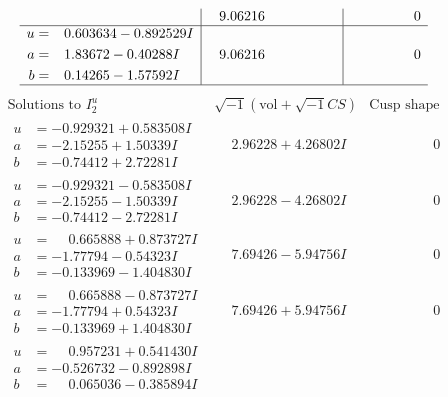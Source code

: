 \documentclass[1p]{elsarticle_modified}
\theoremstyle{definition}
\newcommand{\I}{\sqrt{-1}}
\begin{document}
$$\begin{array}{c|c|c}
 & \phantom{-}9.06216\phantom{ +0.000000I} & \phantom{-0.000000 } 0 \\ \hline\begin{aligned}
u &= \phantom{-}0.603634 - 0.892529 I \\
a &= \phantom{-}1.83672 - 0.40288 I \\
b &= \phantom{-}0.14265 - 1.57592 I\end{aligned}
 & \phantom{-}9.06216\phantom{ +0.000000I} & \phantom{-0.000000 } 0\\
 \hline 
 \end{array}$$\newpage$$\begin{array}{c|c|c}  
\text{Solutions to }I^u_{2}& \I (\text{vol} + \sqrt{-1}CS) & \text{Cusp shape}\\
 \hline 
\begin{aligned}
u &= -0.929321 + 0.583508 I \\
a &= -2.15255 + 1.50339 I \\
b &= -0.74412 + 2.72281 I\end{aligned}
 & \phantom{-}2.96228 + 4.26802 I & \phantom{-0.000000 } 0 \\ \hline\begin{aligned}
u &= -0.929321 - 0.583508 I \\
a &= -2.15255 - 1.50339 I \\
b &= -0.74412 - 2.72281 I\end{aligned}
 & \phantom{-}2.96228 - 4.26802 I & \phantom{-0.000000 } 0 \\ \hline\begin{aligned}
u &= \phantom{-}0.665888 + 0.873727 I \\
a &= -1.77794 - 0.54323 I \\
b &= -0.133969 - 1.404830 I\end{aligned}
 & \phantom{-}7.69426 - 5.94756 I & \phantom{-0.000000 } 0 \\ \hline\begin{aligned}
u &= \phantom{-}0.665888 - 0.873727 I \\
a &= -1.77794 + 0.54323 I \\
b &= -0.133969 + 1.404830 I\end{aligned}
 & \phantom{-}7.69426 + 5.94756 I & \phantom{-0.000000 } 0 \\ \hline\begin{aligned}
u &= \phantom{-}0.957231 + 0.541430 I \\
a &= -0.526732 - 0.892898 I \\
b &= \phantom{-}0.065036 - 0.385894 I\end{aligned}

\end{array}$$
\end{document}
